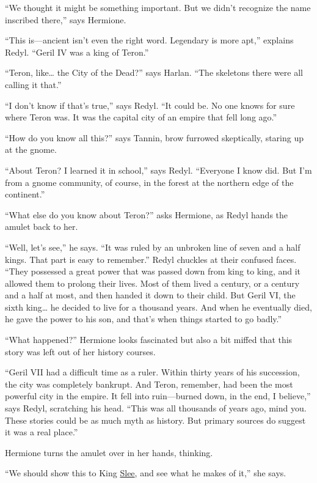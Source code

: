 \documentclass[smalldemyvopaper,11pt,twoside,onecolumn,openright,extrafontsizes]{memoir}
\begin{document}
``We thought it might be something important. But we didn't recognize
the name inscribed there,'' says Hermione.

``This is---ancient isn't even the right word. Legendary is more apt,''
explains Redyl. ``Geril IV was a king of Teron.''

``Teron, like\ldots{} the City of the Dead?'' says Harlan. ``The
skeletons there were all calling it that.''

``I don't know if that's true,'' says Redyl. ``It could be. No one knows
for sure where Teron was. It was the capital city of an empire that fell
long ago.''

``How do you know all this?'' says Tannin, brow furrowed skeptically,
staring up at the gnome.

``About Teron? I learned it in school,'' says Redyl. ``Everyone I know
did. But I'm from a gnome community, of course, in the forest at the
northern edge of the continent.''

``What else do you know about Teron?'' asks Hermione, as Redyl hands the
amulet back to her.

``Well, let's see,'' he says. ``It was ruled by an unbroken line of
seven and a half kings. That part is easy to remember.'' Redyl chuckles
at their confused faces. ``They possessed a great power that was passed
down from king to king, and it allowed them to prolong their lives. Most
of them lived a century, or a century and a half at most, and then
handed it down to their child. But Geril VI, the sixth king\ldots{} he
decided to live for a thousand years. And when he eventually died, he
gave the power to his son, and that's when things started to go badly.''

``What happened?'' Hermione looks fascinated but also a bit miffed that
this story was left out of her history courses.

``Geril VII had a difficult time as a ruler. Within thirty years of his
succession, the city was completely bankrupt. And Teron, remember, had
been the most powerful city in the empire. It fell into ruin---burned
down, in the end, I believe,'' says Redyl, scratching his head. ``This
was all thousands of years ago, mind you. These stories could be as much
myth as history. But primary sources do suggest it was a real place.''

Hermione turns the amulet over in her hands, thinking.

``We should show this to King \href{/characters/slee/}{Slee}, and see
what he makes of it,'' she says.
\end{document}
